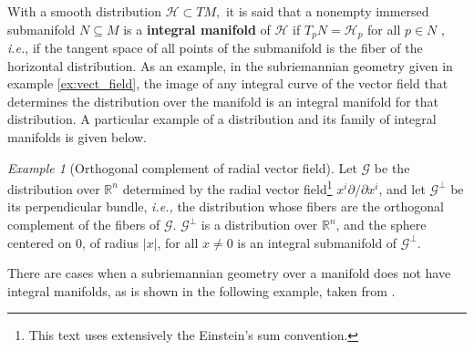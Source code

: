 \documentclass[12pt, letterpaper, reqno]{amsart}
\theoremstyle{definition}
\theoremstyle{plain}
\theoremstyle{remark}
\newtheorem{ex}{Example}
\begin{document}
With a smooth distribution $ \mathcal{H} \subset TM, $ it is said that a nonempty immersed submanifold $ N\subseteq M $  is a \textbf{integral manifold} of $\mathcal{H}$ if $ T_p N = \mathcal{H}_p $ for all $ p\in N $ , \textit{i.e.}, if the tangent space of all points of the submanifold is the fiber of the horizontal distribution. As an example, in the subriemannian geometry given in example \ref{ex:vect_field}, the image of any integral curve of the vector field that determines the distribution over the manifold is an integral manifold for that distribution. A particular example of a distribution and its family of integral manifolds is given below.

\begin{ex}[Orthogonal complement of radial vector field]
	Let $ \mathcal{G} $ be the distribution over $ \mathbb{R}^n $ determined by the radial vector field\footnote{This text uses extensively the Einstein's sum convention.} $ x^i \partial / \partial x^i $, and let $ \mathcal{G}^\perp $ be its perpendicular bundle, \textit{i.e.,} the distribution whose fibers are the orthogonal complement of the fibers of $ \mathcal{G}. $ $ \mathcal{G}^\perp $ is a distribution over $ \mathbb{R}^n  $, and the sphere centered on $0$, of radius $ |x| $, for all $ x\neq0 $ is an integral submanifold of $ \mathcal{G}^\perp. $        
\end{ex}

There are cases when a subriemannian geometry over a manifold does not have integral manifolds, as is shown in the following example, taken from \cite{lee2003introduction}.
\end{document}
